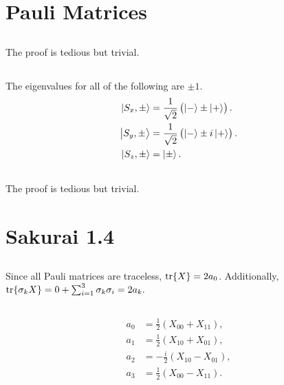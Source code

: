 \documentclass[
a4paper,
10pt,
twoside,
]{article}
\begin{document}
\titleinf
\maketitle
\startmcols

\section{Pauli Matrices}
\subsection{}%
The proof is tedious but trivial.
\subsection{}%
The eigenvalues for all of the following are $\pm 1$.
\begin{align}
	\ket{S_x,\pm} &= \frac{1}{\sqrt{2}} \left(\ket{-}\pm\ket{+}\right).\\
	\ket{S_y,\pm} &= \frac{1}{\sqrt{2}} \left(\ket{-}\pm i\ket{+}\right).\\
	\ket{S_z,\pm} &= \ket{\pm}.
\end{align}
\subsection{}%
The proof is tedious but trivial.
\section{Sakurai 1.4}
\subsection{}%
Since all Pauli matrices are traceless, $\tr{X}= 2a_0$.
Additionally, $\tr{\sigma_k X} = 0 + \sum_{i=1}^3\sigma_k\sigma_i = 2a_k.$

\subsection{}%
\begin{align}
	a_0 &= \frac{1}{2}\left(X_{00} + X_{11}\right),\\
	a_1 &= \frac{1}{2}\left(X_{10} + X_{01}\right),\\
	a_2 &= -\frac{i}{2}\left(X_{10} - X_{01}\right),\\
	a_3 &= \frac{1}{2}\left(X_{00} - X_{11}\right).
\end{align}
\end{document}
